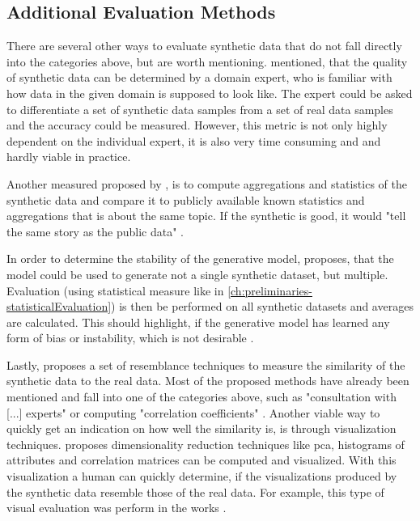 \subsection{Additional Evaluation Methods}
\label{ch:preliminaries-evaluationOfSyntheticTabularData-otherMetrics}

There are several other ways to evaluate synthetic data that do not fall directly into the categories above, but are worth mentioning.
\cite{elemam2020SevenWaysEvaluate} mentioned, that the quality of synthetic data can be determined by a domain expert, 
who is familiar with how data in the given domain is supposed to look like.
The expert could be asked to differentiate a set of synthetic data samples from a set of real data samples and the accuracy could be measured.
However, this metric is not only highly dependent on the individual expert, it is also very time consuming and and hardly viable in practice.

Another measured proposed by \cite{elemam2020SevenWaysEvaluate}, is to compute aggregations and statistics of the synthetic data and compare it to publicly available known statistics and aggregations that is about the same topic.
If the synthetic is good, it would "tell the same story as the public data" \cite[p. 58]{elemam2020SevenWaysEvaluate}.

In order to determine the stability of the generative model, \cite{elemam2020SevenWaysEvaluate} proposes, that the model could be used to generate not a single synthetic dataset, but multiple.
Evaluation (\eg using statistical measure like in \autoref{ch:preliminaries-statisticalEvaluation}) is then be performed on all synthetic datasets and averages are calculated.
This should highlight, if the generative model has learned any form of bias or instability, which is not desirable \cite{elemam2020SevenWaysEvaluate}.

Lastly, \cite{hernandez2022SyntheticDataGeneration} proposes a set of resemblance techniques to measure the similarity of the synthetic data to the real data.
Most of the proposed methods have already been mentioned and fall into one of the categories above, such as "consultation with [...] experts" or computing "correlation coefficients" \cite{hernandez2022SyntheticDataGeneration}.
Another viable way to quickly get an indication on how well the similarity is, is through visualization techniques.
\cite{hernandez2022SyntheticDataGeneration} proposes dimensionality reduction techniques like \gls{pca}, histograms of attributes and correlation matrices can be computed and visualized.
With this visualization a human can quickly determine, if the visualizations produced by the synthetic data resemble those of the real data.
For example, this type of visual evaluation was perform in the works \cite{li2022TTSGANTransformerbasedTimeSeries, leminh2021AirGenGANbasedSynthetica, mckeever2020SynthesisingTabularDatasets}.


